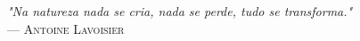 {\sffamily\itshape
"Na natureza nada se cria, nada se perde, tudo se transforma."}\\
--- \textsc{Antoine Lavoisier}
